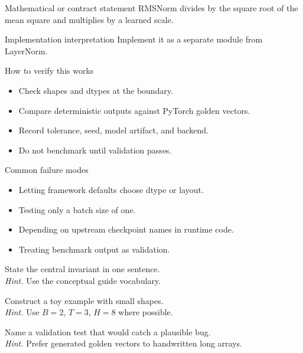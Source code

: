 \begin{definitionbox}{Mathematical or contract statement}
RMSNorm divides by the square root of the mean square and multiplies by a learned scale.
\end{definitionbox}

\begin{implementationbox}{Implementation interpretation}
Implement it as a separate module from LayerNorm.
\end{implementationbox}

\begin{verificationbox}{How to verify this works}
\begin{itemize}
\item Check shapes and dtypes at the boundary.
\item Compare deterministic outputs against PyTorch golden vectors.
\item Record tolerance, seed, model artifact, and backend.
\item Do not benchmark until validation passes.
\end{itemize}
\end{verificationbox}

\begin{warningbox}{Common failure modes}
\begin{itemize}
\item Letting framework defaults choose dtype or layout.
\item Testing only a batch size of one.
\item Depending on upstream checkpoint names in runtime code.
\item Treating benchmark output as validation.
\end{itemize}
\end{warningbox}

\begin{chapterexercises}
\item State the central invariant in one sentence.\\
\textit{Hint.} Use the conceptual guide vocabulary.
\item Construct a toy example with small shapes.\\
\textit{Hint.} Use $B=2$, $T=3$, $H=8$ where possible.
\item Name a validation test that would catch a plausible bug.\\
\textit{Hint.} Prefer generated golden vectors to handwritten long arrays.
\end{chapterexercises}

